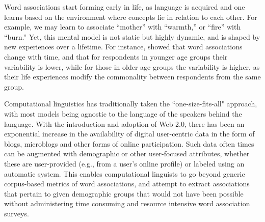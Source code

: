 \documentclass[11pt,letterpaper]{article}
\begin{document}
Word associations start forming early in life, as language is acquired and one learns based on the environment where concepts lie in relation to each other. For example, we may learn to associate ``mother'' with ``warmth,'' or ``fire'' with ``burn.'' Yet, this mental model is not static but highly dynamic, and is shaped by new experiences over a lifetime.  For instance, \cite{Tresselt64} showed that word associations change with time, and that for respondents in younger age groups their variability is lower, %
while for those in older age groups the variability is higher, as their life experiences modify the commonality between respondents from the same group. %

Computational linguistics has traditionally taken the ``one-size-fits-all" approach, with most  models being agnostic to the language of the speakers behind the language. With the introduction and adoption of Web 2.0, there has been an exponential increase in the availability of digital user-centric data in the form of blogs, microblogs and other forms of online participation. Such data often times can be augmented with demographic or other user-focused attributes, whether these are user-provided (e.g., from a user's online profile) or labeled using an automatic system. This enables computational linguists to go beyond generic corpus-based metrics of word associations, and attempt to extract associations that pertain to given demographic groups that would not have been possible without administering time consuming and resource intensive word association surveys.
\end{document}
